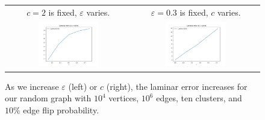 \documentclass[
]{article}
\begin{document}
\begin{figure}[!htb]
  \begin{tabular}{cc}
    {\(c = 2\)} is fixed, {\(\varepsilon\)} varies. & {\(\varepsilon = 0.3\)} is fixed, {\(c\)} varies. \\
    \includegraphics[width=0.5\textwidth]{images/laminar_error_as_epsilon_varies.png}
                                                    &
    \includegraphics[width=0.5\textwidth]{images/laminar_error_as_c_varies.png}                         \\
  \end{tabular}
  \caption{\label{fig:laminar-error-random-graph}
    As we increase $\varepsilon$ (left) or $c$ (right), the laminar error increases for our random graph with $10^4$ vertices, $10^6$ edges, ten clusters, and $10\%$ edge flip probability.}
\end{figure}
\end{document}
